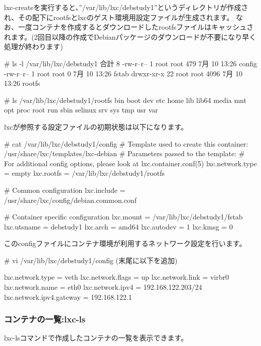 \documentclass[mingoth,a4paper]{jsarticle}
\begin{document}
lxc-createを実行すると、''/var/lib/lxc/debstudy1''というディレクトリが作成され、その配下にrootfsとlxcのゲスト環境用設定ファイルが生成されます。
なお、一度コンテナを作成するとダウンロードしたrootfsファイルはキャッシュされます。(2回目以降の作成でDebianパッケージのダウンロードが不要になり早く処理が終わります)

\begin{commandline}
  # ls -l /var/lib/lxc/debstudy1
  合計 8
  -rw-r--r--  1 root root  479  7月 10 13:26 config
  -rw-r--r--  1 root root    0  7月 10 13:26 fstab
  drwxr-xr-x 22 root root 4096  7月 10 13:26 rootfs

  # ls /var/lib/lxc/debstudy1/rootfs
  bin  boot  dev  etc  home  lib  lib64  media  mnt  opt  proc  root  run  sbin  selinux  srv  sys  tmp  usr  var
\end{commandline}

lxcが参照する設定ファイルの初期状態は以下になります。

\begin{commandline}
  # cat /var/lib/lxc/debstudy1/config
  # Template used to create this container: /usr/share/lxc/templates/lxc-debian
  # Parameters passed to the template:
  # For additional config options, please look at lxc.container.conf(5)
  lxc.network.type = empty
  lxc.rootfs = /var/lib/lxc/debstudy1/rootfs

  # Common configuration
  lxc.include = /usr/share/lxc/config/debian.common.conf

  # Container specific configuration
  lxc.mount = /var/lib/lxc/debstudy1/fstab
  lxc.utsname = debstudy1
  lxc.arch = amd64
  lxc.autodev = 1
  lxc.kmsg = 0
\end{commandline}

このconfigファイルにコンテナ環境が利用するネットワーク設定を行います。

\begin{commandline}
  # vi /var/lib/lxc/debstudy1/config
  (末尾に以下を追加)

  lxc.network.type = veth
  lxc.network.flags = up
  lxc.network.link = virbr0
  lxc.network.name = eth0
  lxc.network.ipv4 = 192.168.122.203/24
  lxc.network.ipv4.gateway = 192.168.122.1
\end{commandline}


\subsubsection{コンテナの一覧:lxc-ls}

lxc-lsコマンドで作成したコンテナの一覧を表示できます。
\end{document}
